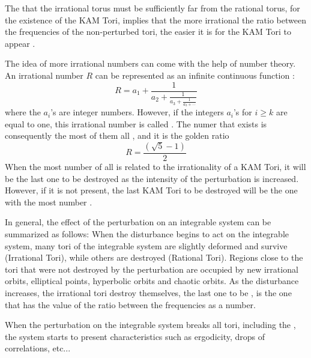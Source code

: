 The that the irrational torus must be sufficiently far from the rational torus, for the existence of the KAM Tori, implies that the more irrational the ratio between the frequencies of the non-perturbed tori, the easier it is for the KAM Tori to appear \cite{lichtenberg2013regular}.\par

The idea of more irrational numbers can come with the help of number theory. An irrational number $R$ can  be represented as an infinite continuous function \cite{ott_chaos_2002}:
\begin{equation}
R=a_1+\frac{1}{a_2+\frac{1}{a_3+\frac{1}{a_3+ \cdots}}}
\end{equation}
where the $a_i$'s are integer numbers. However, if the integers $a_i$'s for $i\geq k$ are equal to one, this irrational number is called  \cite{contopoulos2004order}. The  numer that exists is consequently the most  of them all \cite{contopoulos2004order}, and it is the golden ratio
\begin{equation}
R=\frac{(\sqrt{5}-1)}{2}
\end{equation}
When the most  number of all is related to the irrationality of a KAM Tori, it will be the last one to be destroyed as the intensity of the perturbation is increased. However, if it is not present, the last KAM Tori to be destroyed will be the one with the most  number \cite{contopoulos2004order}.\par

In general, the effect of the perturbation on an integrable system can be summarized as follows: When the disturbance begins to act on the integrable system, many tori of the integrable system are slightly deformed and survive (Irrational Tori), while others are destroyed (Rational Tori). Regions close to the tori that were not destroyed by the perturbation are occupied by new irrational orbits, elliptical points, hyperbolic orbits and chaotic orbits. As the disturbance increases, the irrational tori destroy themselves, the last one to be , is the one that has the value of the ratio between the frequencies as a  number.\par

When the perturbation on the integrable system breaks all tori, including the , the system starts to present characteristics such as ergodicity, drops of correlations, etc...



